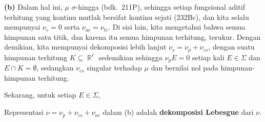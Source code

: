 {\medskip

{\bf (b)} Dalam hal ini, $\mu$ $\sigma$-hingga (bdk.\ 211P), sehingga
setiap fungsional aditif terhitung yang kontinu mutlak bersifat kontinu
sejati (232Bc), dan kita selalu mempunyai $\nu_e=0$ serta
$\nu_{ac}=\nu_{tc}$. Di sisi lain, kita mengetahui bahwa semua himpunan
satu titik, dan karena itu semua himpunan terhitung, terukur. Dengan
demikian, kita mempunyai dekomposisi lebih lanjut
$\nu_s=\nu_p+\nu_{cs}$, dengan suatu himpunan terhitung
$K\subseteq\BbbR^r$ sedemikian sehingga $\nu_pE=0$ setiap kali
$E\in\Sigma$ dan $E\cap K=\emptyset$, sedangkan $\nu_{cs}$ singular
terhadap $\mu$ dan bernilai nol pada himpunan-himpunan terhitung.

Sekarang, untuk setiap $E\in\Sigma$,


}%

\medskip

 Representasi $\nu=\nu_p+\nu_{cs}+\nu_{ac}$
dalam (b) adalah {\bf dekomposisi Lebesgue} dari $\nu$.

